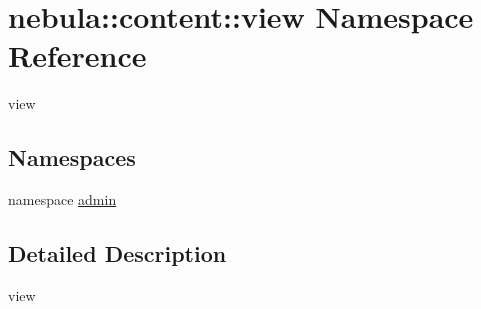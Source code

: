 \hypertarget{namespacenebula_1_1content_1_1view}{
\section{nebula::content::view Namespace Reference}
\label{namespacenebula_1_1content_1_1view}
}


view  
\subsection*{Namespaces}
\begin{DoxyCompactItemize}
\item 
namespace \hyperlink{namespacenebula_1_1content_1_1view_1_1admin}{admin}
\end{DoxyCompactItemize}


\subsection{Detailed Description}
view 